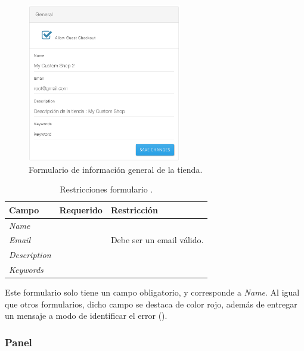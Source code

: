 \begin{figure}[H]
	\centering
	\includegraphics[width=0.6\textwidth]{figuras/dashboard/ecommerce/general_menu/menu.png}
	\caption{Formulario de información general de la tienda.}
	\label{figure:dashboard:ecommerce:general_menu:menu}
\end{figure}

\begin{table}[H]
    \centering
	\begin{tabular}{ |l|c||l| }
		\hline Campo & Requerido & Restricción \\ \hline
		\multirow{1}{*}{\textit{Name}} 			&  {\checkmark} &  \\ \hline
		\multirow{1}{*}{\textit{Email}} 		&  				&  Debe ser un email válido.\\ \hline
		\multirow{1}{*}{\textit{Description}} 	&  				&  \\ \hline
		\multirow{1}{*}{\textit{Keywords}} 		&  				&  \\ \hline
		\hline
	\end{tabular}
 	\caption{Restricciones formulario \generalPanel.}
    \label{tab:dashboard:ecommerce:form:general}
\end{table}


Este formulario solo tiene un campo obligatorio, y corresponde a \textit{Name}. Al igual que otros formularios, dicho campo se destaca de color rojo, además de entregar un mensaje a modo de identificar el error ().



\subsubsection*{Panel \addressPanel}\label{capitulo:solucionImplementada:dashboard:subsubsection:addressPanel}

